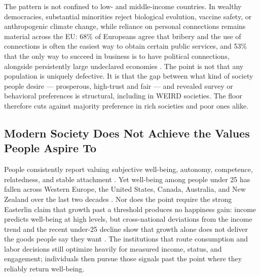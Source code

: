 \documentclass{article}
\theoremstyle{plain}
\theoremstyle{definition}
\theoremstyle{remark}
\begin{document}
The pattern is not confined to low- and middle-income countries. In wealthy democracies, substantial minorities reject biological evolution, vaccine safety, or anthropogenic climate change, while reliance on personal connections remains material across the EU: 68\% of Europeans agree that bribery and the use of connections is often the easiest way to obtain certain public services, and 53\% that the only way to succeed in business is to have political connections, alongside persistently large undeclared economies \citep{gallup2019creation, wellcome2018monitor, pew2023climate, medina2018shadow, eurobarometer2022corruption}. The point is not that any population is uniquely defective. It is that the gap between what kind of society people desire --- prosperous, high-trust and fair --- and revealed survey or behavioral preferences is structural, including in WEIRD societies. The floor therefore cuts against majority preference in rich societies and poor ones alike.

\subsection{Modern Society Does Not Achieve the Values People Aspire To}
People consistently report valuing subjective well-being, autonomy, competence, relatedness, and stable attachment \citep{baumeister1995need, deci2000what, gallup-emotional-health}. Yet well-being among people under 25 has fallen across Western Europe, the United States, Canada, Australia, and New Zealand over the last two decades \citep{whr2026, haidt2024anxious}. Nor does the point require the strong Easterlin claim that growth past a threshold produces no happiness gain: income predicts well-being at high levels, but cross-national deviations from the income trend and the recent under-25 decline show that growth alone does not deliver the goods people say they want \citep{stevensonwolfers2008, killingsworth2023income, whr2026}. The institutions that route consumption and labor decisions still optimize heavily for measured income, status, and engagement; individuals then pursue those signals past the point where they reliably return well-being.
\end{document}
